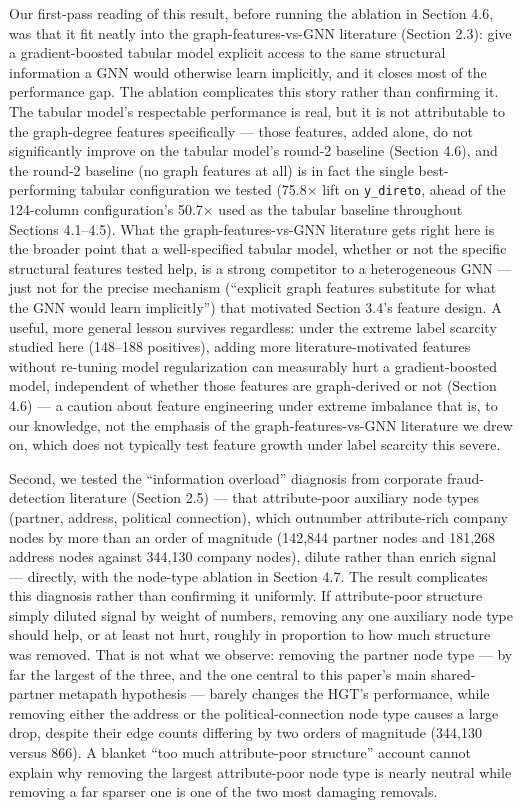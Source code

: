 \documentclass[11pt,]{article}
\begin{document}
Our first-pass reading of this result, before running the ablation in
Section 4.6, was that it fit neatly into the graph-features-vs-GNN
literature (Section 2.3): give a gradient-boosted tabular model explicit
access to the same structural information a GNN would otherwise learn
implicitly, and it closes most of the performance gap. The ablation
complicates this story rather than confirming it. The tabular model's
respectable performance is real, but it is not attributable to the
graph-degree features specifically --- those features, added alone, do
not significantly improve on the tabular model's round-2 baseline
(Section 4.6), and the round-2 baseline (no graph features at all) is in
fact the single best-performing tabular configuration we tested (75.8×
lift on \texttt{y\_direto}, ahead of the 124-column configuration's
50.7× used as the tabular baseline throughout Sections 4.1--4.5). What
the graph-features-vs-GNN literature gets right here is the broader
point that a well-specified tabular model, whether or not the specific
structural features tested help, is a strong competitor to a
heterogeneous GNN --- just not for the precise mechanism (``explicit
graph features substitute for what the GNN would learn implicitly'')
that motivated Section 3.4's feature design. A useful, more general
lesson survives regardless: under the extreme label scarcity studied
here (148--188 positives), adding more literature-motivated features
without re-tuning model regularization can measurably hurt a
gradient-boosted model, independent of whether those features are
graph-derived or not (Section 4.6) --- a caution about feature
engineering under extreme imbalance that is, to our knowledge, not the
emphasis of the graph-features-vs-GNN literature we drew on, which does
not typically test feature growth under label scarcity this severe.

Second, we tested the ``information overload'' diagnosis from corporate
fraud-detection literature (Section 2.5) --- that attribute-poor
auxiliary node types (partner, address, political connection), which
outnumber attribute-rich company nodes by more than an order of
magnitude (142,844 partner nodes and 181,268 address nodes against
344,130 company nodes), dilute rather than enrich signal --- directly,
with the node-type ablation in Section 4.7. The result complicates this
diagnosis rather than confirming it uniformly. If attribute-poor
structure simply diluted signal by weight of numbers, removing any one
auxiliary node type should help, or at least not hurt, roughly in
proportion to how much structure was removed. That is not what we
observe: removing the partner node type --- by far the largest of the
three, and the one central to this paper's main shared-partner metapath
hypothesis --- barely changes the HGT's performance, while removing
either the address or the political-connection node type causes a large
drop, despite their edge counts differing by two orders of magnitude
(344,130 versus 866). A blanket ``too much attribute-poor structure''
account cannot explain why removing the largest attribute-poor node type
is nearly neutral while removing a far sparser one is one of the two
most damaging removals.
\end{document}
